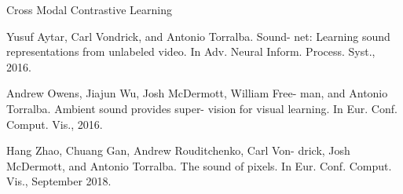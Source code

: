 Cross Modal Contrastive Learning

Yusuf Aytar, Carl Vondrick, and Antonio Torralba. Sound-
net: Learning sound representations from unlabeled video.
In Adv. Neural Inform. Process. Syst., 2016. 

Andrew Owens, Jiajun Wu, Josh McDermott, William Free-
man, and Antonio Torralba. Ambient sound provides super-
vision for visual learning. In Eur. Conf. Comput. Vis., 2016.

Hang Zhao, Chuang Gan, Andrew Rouditchenko, Carl Von-
drick, Josh McDermott, and Antonio Torralba. The sound of
pixels. In Eur. Conf. Comput. Vis., September 2018.
